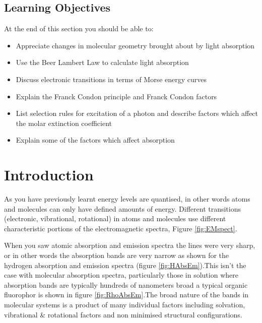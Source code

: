 \documentclass[
]{book}
\providecommand{\tightlist}{%
  \setlength{\itemsep}{0pt}\setlength{\parskip}{0pt}}
\begin{document}
\hypertarget{sec:AbsLOs}{%
\subsection{Learning Objectives}\label{sec:AbsLOs}}

At the end of this section you should be able to:

\begin{itemize}
\tightlist
\item
  Appreciate changes in molecular geometry brought about by light absorption
\item
  Use the Beer Lambert Law to calculate light absorption
\item
  Discuss electronic transitions in terms of Morse energy curves
\item
  Explain the Franck Condon principle and Franck Condon factors
\item
  List selection rules for excitation of a photon and describe factors which affect the molar extinction coefficient
\item
  Explain some of the factors which affect absorption
\end{itemize}

\hypertarget{sec:AbsIntro}{%
\section{Introduction}\label{sec:AbsIntro}}

As you have previously learnt energy levels are quantised, in other words atoms and molecules can only have defined amounts of energy. Different transitions (electronic, vibrational, rotational) in atoms and molecules use different characteristic portions of the electromagnetic spectra, Figure \ref{fig:EMspect}.

When you saw atomic absorption and emission spectra the lines were very sharp, or in other words the absorption bands are very narrow as shown for the hydrogen absorption and emission spectra (figure \ref{fig:HAbsEm}).This isn't the case with molecular absorption spectra, particularly those in solution where absorption bands are typically hundreds of nanometers broad a typical organic fluorophor is shown in figure \ref{fig:RhoAbsEm}.The broad nature of the bands in molecular systems is a product of many individual factors including solvation, vibrational \& rotational factors and non minimised structural configurations.
\end{document}
